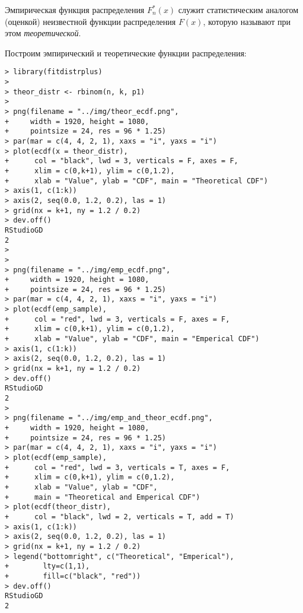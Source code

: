 \documentclass[14pt,a4paper]{scrartcl}
\begin{document}
Эмпирическая функция распределения $F_n^{*}( x )$ служит статистическим аналогом (оценкой) неизвестной функции распределения $F(x)$, которую называют при этом \textit{теоретической}.

Построим эмпирический и теоретические функции распределения:
\begin{verbatim}
> library(fitdistrplus)
> 
> theor_distr <- rbinom(n, k, p1)
> 
> png(filename = "../img/theor_ecdf.png", 
+     width = 1920, height = 1080,
+     pointsize = 24, res = 96 * 1.25)
> par(mar = c(4, 4, 2, 1), xaxs = "i", yaxs = "i")
> plot(ecdf(x = theor_distr), 
+      col = "black", lwd = 3, verticals = F, axes = F,
+      xlim = c(0,k+1), ylim = c(0,1.2),
+      xlab = "Value", ylab = "CDF", main = "Theoretical CDF")
> axis(1, c(1:k))
> axis(2, seq(0.0, 1.2, 0.2), las = 1)
> grid(nx = k+1, ny = 1.2 / 0.2)
> dev.off()
RStudioGD 
2 
> 
> 
> png(filename = "../img/emp_ecdf.png", 
+     width = 1920, height = 1080,
+     pointsize = 24, res = 96 * 1.25)
> par(mar = c(4, 4, 2, 1), xaxs = "i", yaxs = "i")
> plot(ecdf(emp_sample), 
+      col = "red", lwd = 3, verticals = F, axes = F,
+      xlim = c(0,k+1), ylim = c(0,1.2),
+      xlab = "Value", ylab = "CDF", main = "Emperical CDF")
> axis(1, c(1:k))
> axis(2, seq(0.0, 1.2, 0.2), las = 1)
> grid(nx = k+1, ny = 1.2 / 0.2)
> dev.off()
RStudioGD 
2 
> 
> png(filename = "../img/emp_and_theor_ecdf.png", 
+     width = 1920, height = 1080,
+     pointsize = 24, res = 96 * 1.25)
> par(mar = c(4, 4, 2, 1), xaxs = "i", yaxs = "i")
> plot(ecdf(emp_sample), 
+      col = "red", lwd = 3, verticals = T, axes = F,
+      xlim = c(0,k+1), ylim = c(0,1.2),
+      xlab = "Value", ylab = "CDF", 
+      main = "Theoretical and Emperical CDF")
> plot(ecdf(theor_distr), 
+      col = "black", lwd = 2, verticals = T, add = T)
> axis(1, c(1:k))
> axis(2, seq(0.0, 1.2, 0.2), las = 1)
> grid(nx = k+1, ny = 1.2 / 0.2)
> legend("bottomright", c("Theoretical", "Emperical"), 
+        lty=c(1,1), 
+        fill=c("black", "red"))
> dev.off()
RStudioGD 
2 
\end{verbatim}
\pagebreak

\begin{figure}[h]
	\begin{minipage}[h]{0.5\linewidth}
	\end{minipage}
	\hfill
	\begin{minipage}[h]{0.5\linewidth}
	\end{minipage}
	\label{ris:image1}
\end{figure}
\end{document}
